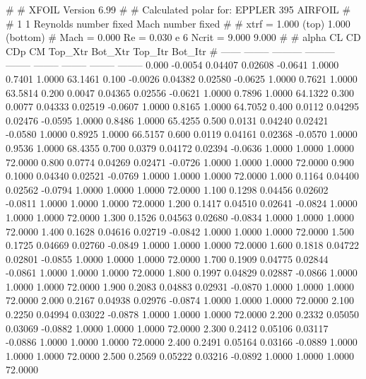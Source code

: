 #  
#       XFOIL         Version 6.99
#  
# Calculated polar for: EPPLER 395 AIRFOIL                              
#  
# 1 1 Reynolds number fixed          Mach number fixed         
#  
# xtrf =   1.000 (top)        1.000 (bottom)  
# Mach =   0.000     Re =     0.030 e 6     Ncrit =   9.000  9.000
#  
#   alpha    CL        CD       CDp       CM     Top_Xtr  Bot_Xtr  Top_Itr  Bot_Itr
#  ------ -------- --------- --------- -------- -------- -------- -------- --------
   0.000  -0.0054   0.04407   0.02608  -0.0641   1.0000   0.7401   1.0000  63.1461
   0.100  -0.0026   0.04382   0.02580  -0.0625   1.0000   0.7621   1.0000  63.5814
   0.200   0.0047   0.04365   0.02556  -0.0621   1.0000   0.7896   1.0000  64.1322
   0.300   0.0077   0.04333   0.02519  -0.0607   1.0000   0.8165   1.0000  64.7052
   0.400   0.0112   0.04295   0.02476  -0.0595   1.0000   0.8486   1.0000  65.4255
   0.500   0.0131   0.04240   0.02421  -0.0580   1.0000   0.8925   1.0000  66.5157
   0.600   0.0119   0.04161   0.02368  -0.0570   1.0000   0.9536   1.0000  68.4355
   0.700   0.0379   0.04172   0.02394  -0.0636   1.0000   1.0000   1.0000  72.0000
   0.800   0.0774   0.04269   0.02471  -0.0726   1.0000   1.0000   1.0000  72.0000
   0.900   0.1000   0.04340   0.02521  -0.0769   1.0000   1.0000   1.0000  72.0000
   1.000   0.1164   0.04400   0.02562  -0.0794   1.0000   1.0000   1.0000  72.0000
   1.100   0.1298   0.04456   0.02602  -0.0811   1.0000   1.0000   1.0000  72.0000
   1.200   0.1417   0.04510   0.02641  -0.0824   1.0000   1.0000   1.0000  72.0000
   1.300   0.1526   0.04563   0.02680  -0.0834   1.0000   1.0000   1.0000  72.0000
   1.400   0.1628   0.04616   0.02719  -0.0842   1.0000   1.0000   1.0000  72.0000
   1.500   0.1725   0.04669   0.02760  -0.0849   1.0000   1.0000   1.0000  72.0000
   1.600   0.1818   0.04722   0.02801  -0.0855   1.0000   1.0000   1.0000  72.0000
   1.700   0.1909   0.04775   0.02844  -0.0861   1.0000   1.0000   1.0000  72.0000
   1.800   0.1997   0.04829   0.02887  -0.0866   1.0000   1.0000   1.0000  72.0000
   1.900   0.2083   0.04883   0.02931  -0.0870   1.0000   1.0000   1.0000  72.0000
   2.000   0.2167   0.04938   0.02976  -0.0874   1.0000   1.0000   1.0000  72.0000
   2.100   0.2250   0.04994   0.03022  -0.0878   1.0000   1.0000   1.0000  72.0000
   2.200   0.2332   0.05050   0.03069  -0.0882   1.0000   1.0000   1.0000  72.0000
   2.300   0.2412   0.05106   0.03117  -0.0886   1.0000   1.0000   1.0000  72.0000
   2.400   0.2491   0.05164   0.03166  -0.0889   1.0000   1.0000   1.0000  72.0000
   2.500   0.2569   0.05222   0.03216  -0.0892   1.0000   1.0000   1.0000  72.0000
